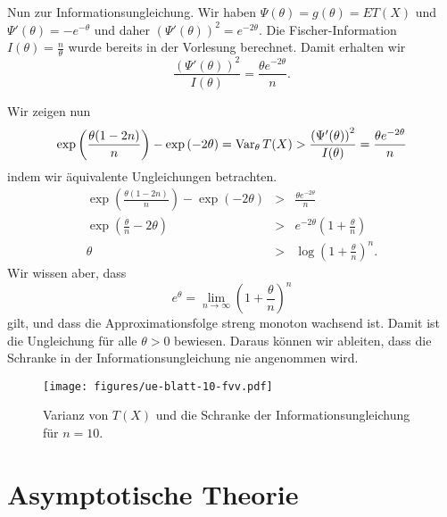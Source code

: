 Nun zur Informationsungleichung. Wir haben $\Psi(\theta)=g(\theta)=E T(X)$ und 
$\Psi'(\theta)=-e^{-\theta}$ und daher 
$\left( \Psi'(\theta) \right)^2 = e^{-2\theta}$. Die Fischer-Information 
$I(\theta)=\frac{n}{\theta}$ wurde bereits in der Vorlesung berechnet. Damit erhalten wir 
\begin{equation}
    \frac{\left( \Psi'(\theta) \right)^2}{I(\theta)} = \frac{\theta e^{-2 \theta} }{n}.
\end{equation}

Wir zeigen nun
\begin{equation}
    \exp\left( \frac{\theta(1-2n)}{n} \right) - \exp\left( -2\theta \right) = \operatorname{Var}_\theta T(X)
    > \frac{\left( \Psi'(\theta) \right)^2}{I(\theta)} = \frac{\theta e^{-2 \theta} }{n}
\end{equation}
indem wir äquivalente Ungleichungen betrachten.
\begin{eqnarray}
    \exp\left( \frac{\theta(1-2n)}{n} \right) - \exp\left( -2\theta \right) 
    &>& \frac{\theta e^{-2 \theta} }{n} \\
    \exp\left( \frac{\theta}{n} -2\theta \right) &>& e^{-2\theta} \left( 1+\frac{\theta}{n} \right) \\
    \theta &>& \log \left( 1+\frac{\theta}{n} \right)^n.
\end{eqnarray}
Wir wissen aber, dass
\begin{equation}
    e^\theta = \lim_{n\to\infty} \left( 1+\frac{\theta}{n} \right)^n
\end{equation}
gilt, und dass die Approximationsfolge streng monoton wachsend ist. Damit ist die Ungleichung
für alle $\theta>0$ bewiesen. Daraus können wir ableiten, dass die Schranke in der 
Informationsungleichung nie angenommen wird.

\begin{figure}[htb]
    \begin{center}
        \texttt{[image: figures/ue-blatt-10-fvv.pdf]}
    \end{center}
    \caption{Varianz von $T(X)$ und die Schranke der Informationsungleichung für $n=10$.}
    \label{fig:fvv}
\end{figure}





\section{Asymptotische Theorie}


